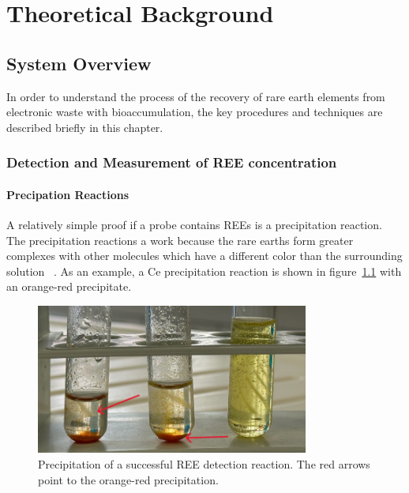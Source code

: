 \chapter{Theoretical Background}

\section{System Overview}

In order to understand the process of the recovery of rare earth elements from electronic waste with bioaccumulation, the key procedures and techniques are described briefly in this chapter.


\subsection{Detection and Measurement of REE concentration\authorA}

\subsubsection{Precipation Reactions}
A relatively simple proof if a probe contains REEs is a precipitation reaction.
The precipitation reactions a work because the rare earths form greater complexes with other molecules which have a different color than the surrounding solution ~\cite{janderblasius}.
As an example, a Ce precipitation reaction is shown in figure~\ref{fig:cer_precipitation_cropped} with an orange-red precipitate.

\begin{figure}[H]
    \centering
    \includegraphics[width=0.8\textwidth]{./media/images/ree_precipitation_reaction_cropped}
    \caption{Precipitation of a successful REE detection reaction. The red arrows point to the orange-red precipitation.}
    \label{fig:cer_precipitation_cropped}
\end{figure}

